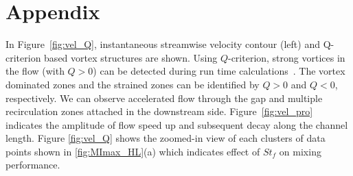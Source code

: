 \documentclass[%
 aip,
 amsmath,amssymb,
 reprint,
]{revtex4-1}
\begin{document}



\newpage

\section*{Appendix}
\appendix

\onecolumngrid
In Figure~\ref{fig:vel_Q}, instantaneous streamwise velocity contour (left) and Q-criterion based vortex structures are shown. Using $Q$-criterion, strong vortices in the flow (with $Q>0$) can be detected during run time calculations~\cite{Hunt1994, Hussain1995, Holmes2012, Rowley2014}. The vortex dominated zones and the strained zones can be identified by $Q>0$ and $Q<0$, respectively. We can observe accelerated flow through the gap and multiple recirculation zones attached in the downstream side. Figure~\ref{fig:vel_pro} indicates the amplitude of flow speed up and subsequent decay along the channel length. Figure \ref{fig:vel_Q} shows the zoomed-in view of each clusters of data points shown in \ref{fig:MImax_HL}(a) which indicates effect of $St_f$ on mixing performance.
\end{document}
